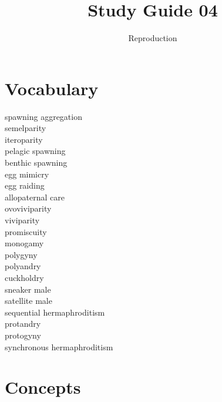 \documentclass[nofonts, letterpaper]{tufte-handout}
\title{Study Guide 04}
\author{Reproduction}
\date{} %
\begin{document}
\maketitle	%


\section{Vocabulary} 
\vspace{-1\baselineskip}
\begin{multicols}{2}
spawning aggregation \\
semelparity \\
iteroparity \\
pelagic spawning \\
benthic spawning \\
egg mimicry \\
egg raiding \\
allopaternal care \\
ovoviviparity \\
viviparity \\
promiscuity \\
monogamy \\
polygyny \\
polyandry \\
cuckholdry \\
sneaker male \\
satellite male \\
sequential hermaphroditism \\
protandry \\
protogyny \\
synchronous hermaphroditism 
\end{multicols}

\section{Concepts}
\end{document}
